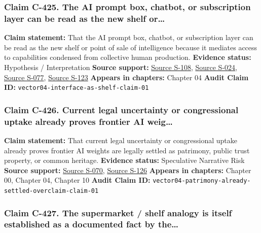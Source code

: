 \documentclass[
  american,
  11pt,
  letterpaper,
]{article}
\begin{document}
\subsubsection{Claim C-425. The AI prompt box, chatbot, or subscription
layer can be read as the new shelf
or\ldots{}}\label{claim-c-425-the-ai-prompt-box-chatbot-or-subscription-layer-can-be-read-as-the-new-shelf-or}

\textbf{Claim statement:} That the AI prompt box, chatbot, or
subscription layer can be read as the new shelf or point of sale of
intelligence because it mediates access to capabilities condensed from
collective human production. \textbf{Evidence status:} Hypothesis /
Interpretation \textbf{Source support:}
\hyperref[source-s-108-language-models-are-unsupervised-multitask-learners]{Source
S-108},
\hyperref[source-s-024-reddit-strikes-60m-deal-allowing-google-to-train-ai-models-on-its-posts-unveils-ipo-plans]{Source
S-024},
\hyperref[source-s-077-the-problem-with-annotation-human-labour-and-outsourcing-between-france-and-madagascar]{Source
S-077},
\hyperref[source-s-123-how-ai-is-ruining-your-life-to-build-an-empire]{Source
S-123} \textbf{Appears in chapters:} Chapter 04 \textbf{Audit Claim ID:}
\texttt{vector04-interface-as-shelf-claim-01}

\subsubsection{Claim C-426. Current legal uncertainty or congressional
uptake already proves frontier AI
weig\ldots{}}\label{claim-c-426-current-legal-uncertainty-or-congressional-uptake-already-proves-frontier-ai-weig}

\textbf{Claim statement:} That current legal uncertainty or
congressional uptake already proves frontier AI weights are legally
settled as patrimony, public trust property, or common heritage.
\textbf{Evidence status:} Speculative Narrative Risk \textbf{Source
support:}
\hyperref[source-s-070-bipartisan-house-task-force-report-on-artificial-intelligence]{Source
S-070},
\hyperref[source-s-126-copyright-and-artificial-intelligence-part-3-generative-ai-training-pre-publication-version]{Source
S-126} \textbf{Appears in chapters:} Chapter 00, Chapter 04, Chapter 10
\textbf{Audit Claim ID:}
\texttt{vector04-patrimony-already-settled-overclaim-claim-01}

\subsubsection{Claim C-427. The supermarket / shelf analogy is itself
established as a documented fact by
the\ldots{}}\label{claim-c-427-the-supermarket-shelf-analogy-is-itself-established-as-a-documented-fact-by-the}
\end{document}
